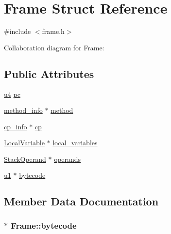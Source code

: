 \hypertarget{structFrame}{}\section{Frame Struct Reference}
\label{structFrame}


{\ttfamily \#include $<$frame.\+h$>$}



Collaboration diagram for Frame\+:
\subsection*{Public Attributes}
\begin{DoxyCompactItemize}
\item 
\hyperlink{structures_8h_ae391a1d79bb0c8cbc283f0283e3c098b}{u4} \hyperlink{structFrame_ada6a6cf76d00cbadf43a86a686dd026c}{pc}
\item 
\hyperlink{structmethod__info}{method\+\_\+info} $\ast$ \hyperlink{structFrame_af0943cac72b53aa5aa67f3e7097430a1}{method}
\item 
\hyperlink{structcp__info}{cp\+\_\+info} $\ast$ \hyperlink{structFrame_ada1bd832b6f72f87a35d88c68b9a188a}{cp}
\item 
\hyperlink{structLocalVariable}{Local\+Variable} $\ast$ \hyperlink{structFrame_a1a3968ae645e9c154229a2631639ebd5}{local\+\_\+variables}
\item 
\hyperlink{structStackOperand}{Stack\+Operand} $\ast$ \hyperlink{structFrame_ab311fc7762ab460f039e58b024c4d229}{operands}
\item 
\hyperlink{structures_8h_a64f8055b64cf2a4c299c841130c5c938}{u1} $\ast$ \hyperlink{structFrame_ad3bdd8cc30352e62af5898b699d54c16}{bytecode}
\end{DoxyCompactItemize}


\subsection{Member Data Documentation}
\subsubsection[{\texorpdfstring{bytecode}{bytecode}}]{$\ast$ Frame\+::bytecode}\hypertarget{structFrame_ad3bdd8cc30352e62af5898b699d54c16}{}\label{structFrame_ad3bdd8cc30352e62af5898b699d54c16}
